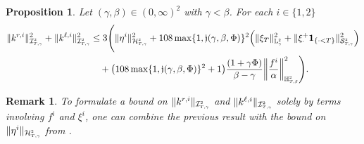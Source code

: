 \documentclass[10pt]{article} %
\newtheorem{proposition}[theorem]{Proposition}
\newtheorem{remark}[theorem]{Remark}
\newcommand\cH{\mathcal H}
\newcommand\cI{\mathcal I}
\newcommand\cS{\mathcal S}
\newcommand{\smalltext}[1]{\text{\fontsize{4}{4}\selectfont$#1$}}
\def \H{\mathbb{H}}
\def \L{\mathbb{L}}
\begin{document}
\begin{proposition}\label{prop::weighted_k_estimate}
	Let $(\gamma,\beta) \in (0,\infty)^2$ with $\gamma < \beta$. For each $i \in \{1,2\}$
	\begin{align}\label{eq::weighted_k_inequality}
		\|k^{r,i}\|^2_{\cI^\smalltext{2}_{\smalltext{T}\smalltext{,}\smalltext{\gamma}}} + \|k^{\ell,i}\|^2_{\cI^\smalltext{2}_{\smalltext{T}\smalltext{,}\smalltext{\gamma}}} 
		&\leq 3 \Bigg( \|\eta^i\|^2_{\cH^\smalltext{2}_{\smalltext{T}\smalltext{,}\smalltext{\gamma}}} + 108 \max\{1, \mathfrak{j}(\gamma,\beta,\Phi)\}^2\Big(\|\xi_T\|^2_{\L^\smalltext{2}_\smalltext{\gamma}} + \|\xi^+_\cdot\mathbf{1}_{\{\cdot < T\}}\|^2_{\cS^\smalltext{2}_{\smalltext{T}\smalltext{,}\smalltext{\gamma}}} \Big) \nonumber\\
		&\quad + \big(108 \max\{1, \mathfrak{j}(\gamma,\beta,\Phi)\}^2 + 1\big)\frac{(1+\gamma\Phi)}{\beta-\gamma}\bigg\|\frac{f^i}{\alpha}\bigg\|^2_{\H^\smalltext{2}_{\smalltext{T}\smalltext{,}\smalltext{\beta}}} \Bigg).
	\end{align}
\end{proposition}

\begin{remark}
	To formulate a bound on $\|k^{r,i}\|_{\cI^\smalltext{2}_{\smalltext{T}\smalltext{,}\smalltext{\gamma}}}$ and $\|k^{\ell,i}\|_{\cI^\smalltext{2}_{\smalltext{T}\smalltext{,}\smalltext{\gamma}}}$ solely by terms involving $f^i$ and $\xi^i$, one can combine the previous result with the bound on $\|\eta^i\|_{\cH^\smalltext{2}_{\smalltext{T}\smalltext{,}\smalltext{\gamma}}}$ from {\rm{}}.
\end{remark}
\end{document}
